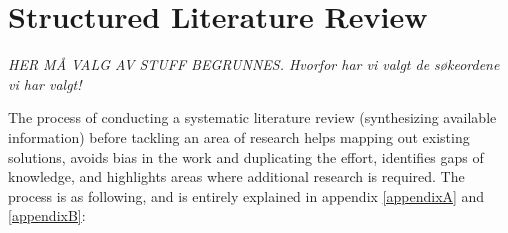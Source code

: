 \section{Structured Literature Review}

\emph{\color{red} HER MÅ VALG AV STUFF BEGRUNNES. Hvorfor har vi valgt de søkeordene vi har valgt! }

The process of conducting a systematic literature review (synthesizing available information) before tackling an area of research helps mapping out existing solutions, avoids bias in the work and duplicating the effort, identifies gaps of knowledge, and highlights areas where additional research is required\citep{kofod2014}. The process is as following, and is entirely explained in appendix \ref{appendixA} and \ref{appendixB}:
